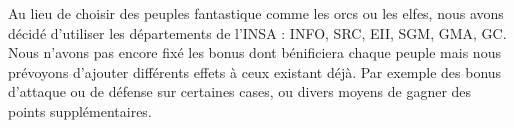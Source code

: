 Au lieu de choisir des peuples fantastique comme les orcs ou les elfes, nous avons décidé d'utiliser les départements de l'INSA : INFO, SRC, EII, SGM, GMA, GC. Nous n'avons pas encore fixé les bonus dont bénificiera chaque peuple mais nous prévoyons d'ajouter différents effets à ceux existant déjà. Par exemple des bonus d'attaque ou de défense sur certaines cases, ou divers moyens de gagner des points supplémentaires.